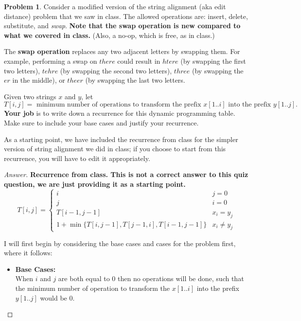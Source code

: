 \documentclass[11pt]{article}
\theoremstyle{definition}
\theoremstyle{definition}
\newtheorem{required}{Problem}
\theoremstyle{definition}
\begin{document}
\setcounter{required}{21}
\begin{required} 
Consider a modified version of the string alignment (aka edit distance) problem that we saw in class. The allowed operations are: insert, delete, substitute, and \emph{swap}. \textbf{Note that the swap operation is new compared to what we covered in class.} (Also, a no-op, which is free, as in class.)

The \textbf{swap operation} replaces any two adjacent letters by swapping them. For example, performing a swap on $there$ could result in $htere$ (by swapping the first two letters), $tehre$ (by swapping the second two letters), $three$ (by swapping the $er$ in the middle), or $theer$ (by swapping the last two letters. 

Given two strings $x$ and $y$, let
\[
T[i,j] = \text{ minimum number of operations to transform the prefix $x[1..i]$ into the prefix $y[1..j]$.}
\]
\textbf{Your job} is to write down a recurrence for this dynamic programming table. Make sure to include your base cases and justify your recurrence.

As a starting point, we have included the recurrence from class for the simpler version of string alignment we did in class; if you choose to start from this recurrence, you will have to edit it appropriately. 

\begin{proof}[Answer]
\textbf{Recurrence from class. This is not a correct answer to this quiz question, we are just providing it as a starting point.}
\[
T[i,j] = \begin{cases}
i & j = 0 \\
j & i = 0 \\
T[i-1,j-1] & x_i = y_j \\
1 + \min\{T[i,j-1], T[j-1,i], T[i-1,j-1]\} & x_i \neq y_j
\end{cases}
\]

I will first begin by considering the base cases and cases for the problem first, where it follows: \\
\begin{itemize}
\item \textbf{Base Cases:} \\
When $i$ and $j$ are both equal to 0 then no operations will be done, such that the minimum number of operation to transform the $x[1..i]$ into the prefix $y[1..j]$ would be 0. \\


\end{itemize}
\end{proof}
\end{required}
\end{document}
